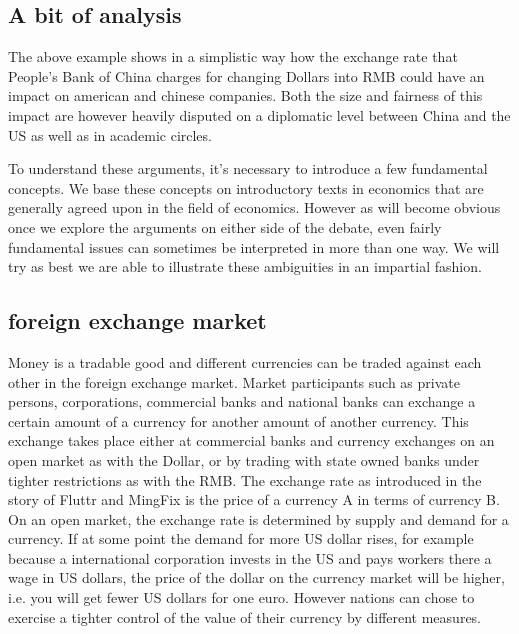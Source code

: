 \documentclass[11pt]{article}
\begin{document}
\subsection{A bit of analysis}

The above example shows in a simplistic way how the exchange rate that 
People's Bank of China charges for changing Dollars into RMB could have 
an impact on american and chinese companies. Both the size and fairness 
of this impact are however heavily disputed on a diplomatic level 
between China and the US as well as in academic circles.

To understand these arguments, it's necessary to introduce a few 
fundamental concepts. We base these concepts on introductory texts in 
economics that are generally agreed upon in the field of economics.  
However as will become obvious once we explore the arguments on either 
side of the debate, even fairly fundamental issues can sometimes be 
interpreted in more than one way. We will try as best we are able to 
illustrate these ambiguities in an impartial fashion.



\subsection{foreign exchange market}

Money is a tradable good and different currencies can be traded against 
each other in the foreign exchange market. Market participants such as 
private persons, corporations, commercial banks and national banks can 
exchange a certain amount of a currency for another amount of another 
currency. This exchange takes place either at commercial banks and 
currency exchanges on an open market as with the Dollar, or by trading 
with state owned banks under tighter restrictions as with the RMB. The 
exchange rate as introduced in the story of Fluttr and MingFix is the
price of a currency A in terms of currency B. On an open market, the 
exchange rate is determined by supply and demand for a currency. If at 
some point the demand for more US dollar rises, for example because a 
international corporation invests in the US and pays workers there a 
wage in US dollars, the price of the dollar on the currency market will 
be higher, i.e. you will get fewer US dollars for one euro. However 
nations can chose to exercise a tighter control of the value of their 
currency by different measures.
\end{document}
